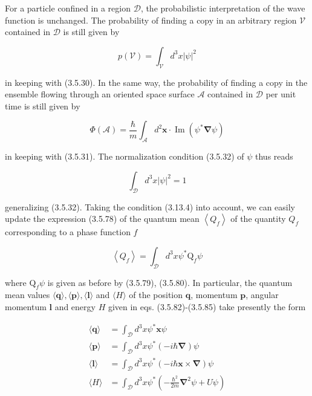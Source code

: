 \documentclass{article}
\begin{document}
For a particle confined in a region $\mathcal{D}$, the probabilistic interpretation of the wave function is unchanged. The probability of finding a copy in an arbitrary region $\mathcal{V}$ contained in $\mathcal{D}$ is still given by
 
\begin{equation*}
p(\mathcal{V})=\int_{\mathcal{V}} d^{3} x|\psi|^{2} \tag{3.13.21}
\end{equation*}
 
in keeping with (3.5.30). In the same way, the probability of finding a copy in the ensemble flowing through an oriented space surface $\mathcal{A}$ contained in $\mathcal{D}$ per unit time is still given by
 
\begin{equation*}
\Phi(\mathcal{A})=\frac{\hbar}{m} \int_{\mathcal{A}} d^{2} \boldsymbol{x} \cdot \operatorname{Im}\left(\psi^{*} \boldsymbol{\nabla} \psi\right) \tag{3.13.22}
\end{equation*}
 
in keeping with (3.5.31). The normalization condition (3.5.32) of $\psi$ thus reads
 
\begin{equation*}
\int_{\mathcal{D}} d^{3} x|\psi|^{2}=1 \tag{3.13.23}
\end{equation*}
 
generalizing (3.5.32).
Taking the condition (3.13.4) into account, we can easily update the expression (3.5.78) of the quantum mean $\left\langle Q_{f}\right\rangle$ of the quantity $Q_{f}$ corresponding to a phase function $f$
 
\begin{equation*}
\left\langle Q_{f}\right\rangle=\int_{\mathcal{D}} d^{3} x \psi^{*} \mathrm{Q}_{f} \psi \tag{3.13.24}
\end{equation*}
 
where $\mathrm{Q}_{f} \psi$ is given as before by (3.5.79), (3.5.80). In particular, the quantum mean values $\langle\boldsymbol{q}\rangle,\langle\boldsymbol{p}\rangle,\langle\boldsymbol{l}\rangle$ and $\langle H\rangle$ of the position $\boldsymbol{q}$, momentum $\boldsymbol{p}$, angular momentum $\boldsymbol{l}$ and energy $H$ given in eqs. (3.5.82)-(3.5.85) take presently the form
 
\begin{align*}
\langle\boldsymbol{q}\rangle & =\int_{\mathcal{D}} d^{3} x \psi^{*} \boldsymbol{x} \psi  \tag{3.13.25}\\
\langle\boldsymbol{p}\rangle & =\int_{\mathcal{D}} d^{3} x \psi^{*}(-i \hbar \boldsymbol{\nabla}) \psi  \tag{3.13.26}\\
\langle\boldsymbol{l}\rangle & =\int_{\mathcal{D}} d^{3} x \psi^{*}(-i \hbar \boldsymbol{x} \times \boldsymbol{\nabla}) \psi  \tag{3.13.27}\\
\langle H\rangle & =\int_{\mathcal{D}} d^{3} x \psi^{*}\left(-\frac{\hbar^{2}}{2 m} \boldsymbol{\nabla}^{2} \psi+U \psi\right) \tag{3.13.28}
\end{align*}
 
\end{document}
